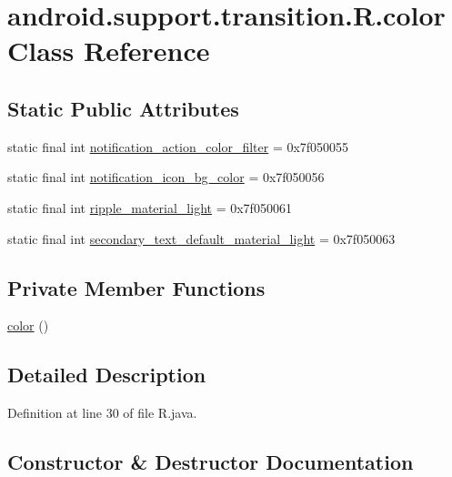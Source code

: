 \hypertarget{classandroid_1_1support_1_1transition_1_1_r_1_1color}{}\section{android.\+support.\+transition.\+R.\+color Class Reference}
\label{classandroid_1_1support_1_1transition_1_1_r_1_1color}
\subsection*{Static Public Attributes}
\begin{DoxyCompactItemize}
\item 
static final int \mbox{\hyperlink{classandroid_1_1support_1_1transition_1_1_r_1_1color_a6a6df80fff832d185392a8e152772700}{notification\+\_\+action\+\_\+color\+\_\+filter}} = 0x7f050055
\item 
static final int \mbox{\hyperlink{classandroid_1_1support_1_1transition_1_1_r_1_1color_a92b724b9c9bbb81bdfe7189cad5bd0da}{notification\+\_\+icon\+\_\+bg\+\_\+color}} = 0x7f050056
\item 
static final int \mbox{\hyperlink{classandroid_1_1support_1_1transition_1_1_r_1_1color_afab65b7b77b985fd99ac16a5da6a69f9}{ripple\+\_\+material\+\_\+light}} = 0x7f050061
\item 
static final int \mbox{\hyperlink{classandroid_1_1support_1_1transition_1_1_r_1_1color_afbd843fca5d7d47368461266ae06ad27}{secondary\+\_\+text\+\_\+default\+\_\+material\+\_\+light}} = 0x7f050063
\end{DoxyCompactItemize}
\subsection*{Private Member Functions}
\begin{DoxyCompactItemize}
\item 
\mbox{\hyperlink{classandroid_1_1support_1_1transition_1_1_r_1_1color_a7020ccb0d5a561f8c367f128df51fa06}{color}} ()
\end{DoxyCompactItemize}


\subsection{Detailed Description}


Definition at line 30 of file R.\+java.



\subsection{Constructor \& Destructor Documentation}
\mbox{\label{classandroid_1_1support_1_1transition_1_1_r_1_1color_a7020ccb0d5a561f8c367f128df51fa06}} 
